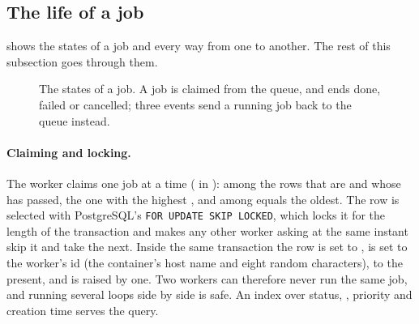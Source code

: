\subsection{The life of a job}

 shows the states of a job and every way from one to another. The
rest of this subsection goes through them.

\begin{figure}[H]
\centering
{}
\caption{The states of a job. A job is claimed from the queue, and ends done, failed or
  cancelled; three events send a running job back to the queue instead.}\label{fig:arch:jobstates}
\end{figure}

\paragraph{Claiming and locking.} The worker claims one job at a time ( in
): among the rows that are  and whose  has
passed, the one with the highest , and among equals the oldest. The row is
selected with PostgreSQL's \texttt{FOR UPDATE SKIP LOCKED}, which locks it for the length of
the transaction and makes any other worker asking at the same instant skip it and take the
next. Inside the same transaction the row is set to ,  is set
to the worker's id (the container's host name and eight random characters),
 to the present, and  is raised by one. Two workers can
therefore never run the same job, and running several loops side by side is safe. An index
over status, , priority and creation time serves the query.

